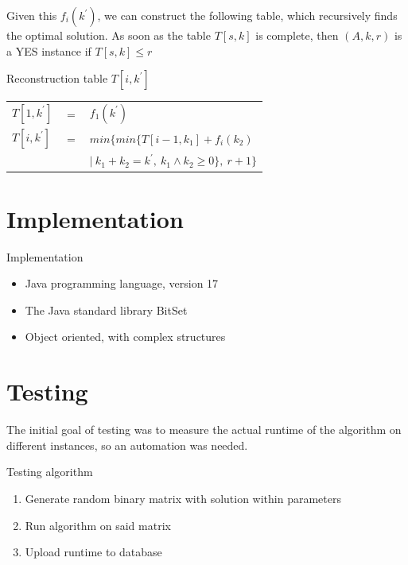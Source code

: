 \documentclass{beamer}
\begin{document}
\begin{frame}
  Given this $f_i(k^\prime)$, we can construct the following table, which recursively finds the optimal 
  solution. As soon as the table $T[s,k]$ is complete, then $(A,k,r)$ is a YES instance 
  if $T[s,k] \leq r$

  \begin{block}{Reconstruction table $T[i,k^\prime]$}
    \begin{tabular}{lcl}
      $T[1, k^\prime]$ & $=$ & $f_1(k^\prime)$                                              \\
      $T[i, k^\prime]$ & $=$ & $min\{ min\{ T[ i-1, k_1 ] + f_i(k_2)$                       \\
                       &     & $|~ k_1 + k_2 = k^\prime, ~k_1 \wedge k_2 \geq 0\}, ~r+1 \}$
    \end{tabular}
  \end{block}
\end{frame}

\section{Implementation}
\begin{frame}
  \begin{block}{Implementation}
    \begin{itemize}
      \item<1-> Java programming language, version 17
      \item<2-> The Java standard library \alert{BitSet}
      \item<3-> Object oriented, with complex structures
    \end{itemize}
  \end{block}
\end{frame}

\section{Testing}
\begin{frame}
  The initial goal of testing was to measure the actual runtime of the algorithm on different instances,
  so an automation was needed.

  \begin{block}{Testing algorithm}
    \begin{enumerate}
      \item<1-> Generate random binary matrix with solution within parameters
      \item<2-> Run algorithm on said matrix
      \item<3-> Upload runtime to database
    \end{enumerate}
  \end{block}
\end{frame}
\end{document}
